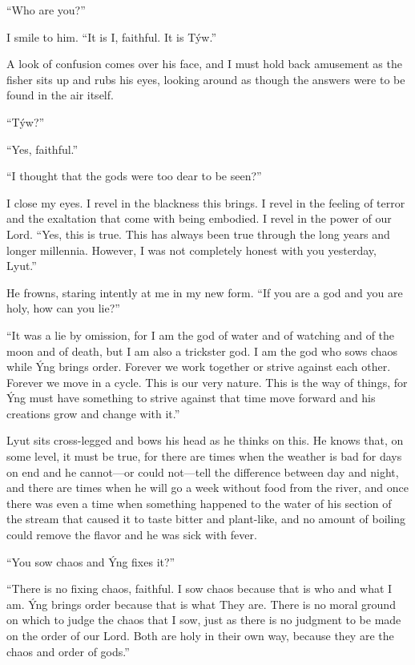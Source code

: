 ``Who are you?''

I smile to him. ``It is I, faithful. It is Týw.''

A look of confusion comes over his face, and I must hold back amusement as the fisher sits up and rubs his eyes, looking around as though the answers were to be found in the air itself.

``Týw?''

``Yes, faithful.''

``I thought that the gods were too dear to be seen?''

I close my eyes. I revel in the blackness this brings. I revel in the feeling of terror and the exaltation that come with being embodied. I revel in the power of our Lord. ``Yes, this is true. This has always been true through the long years and longer millennia. However, I was not completely honest with you yesterday, Lyut.''

He frowns, staring intently at me in my new form. ``If you are a god and you are holy, how can you lie?''

``It was a lie by omission, for I am the god of water and of watching and of the moon and of death, but I am also a trickster god. I am the god who sows chaos while Ýng brings order. Forever we work together or strive against each other. Forever we move in a cycle. This is our very nature. This is the way of things, for Ýng must have something to strive against that time move forward and his creations grow and change with it.''

Lyut sits cross-legged and bows his head as he thinks on this. He knows that, on some level, it must be true, for there are times when the weather is bad for days on end and he cannot---or could not---tell the difference between day and night, and there are times when he will go a week without food from the river, and once there was even a time when something happened to the water of his section of the stream that caused it to taste bitter and plant-like, and no amount of boiling could remove the flavor and he was sick with fever.

``You sow chaos and Ýng fixes it?''

``There is no fixing chaos, faithful. I sow chaos because that is who and what I am. Ýng brings order because that is what They are. There is no moral ground on which to judge the chaos that I sow, just as there is no judgment to be made on the order of our Lord. Both are holy in their own way, because they are the chaos and order of gods.''

